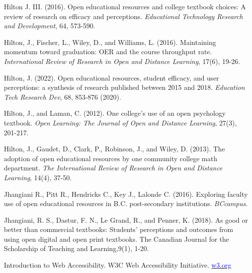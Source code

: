 \documentclass[11pt]{article}
\newcommand{\alink}[2]{\href{#1}{\textcolor{blue}{#2}}}
\begin{document}
\begin{thebibliography}{99}
   Hilton J. III. (2016). Open educational resources and college textbook choices: A review of research on efficacy and perceptions. {\em Educational Technology Research and Development}, 64, 573-590.

   Hilton, J., Fischer, L., Wiley, D., and Williams, L. (2016). Maintaining momentum toward graduation: OER and the course throughput rate. {\em International Review of Research in Open and Distance Learning}, 17(6), 19-26.

   Hilton, J. (2022). Open educational resources, student efficacy, and user perceptions: a synthesis of research published between 2015 and 2018. {\em Education Tech Research Dev}, 68, 853-876 (2020).%

   Hilton, J., and Laman, C. (2012). One college’s use of an open psychology textbook. {\em Open Learning: The Journal of Open and Distance Learning}, 27(3), 201-217.

   Hilton, J., Gaudet, D., Clark, P., Robinson, J., and Wiley, D. (2013). The adoption of open educational resources by one community college math department. {\em The International Review of Research in Open and Distance Learning}, 14(4), 37-50.

   Jhangiani R., Pitt R., Hendricks C., Key J., Lalonde C. (2016). Exploring faculty use of open educational resources in B.C. post-secondary institutions. {\em BCcampus}. %

   Jhangiani, R. S., Dastur, F. N., Le Grand, R., and Penner, K. (2018). As good or better than commercial textbooks: Students' perceptions and outcomes from using open digital and open print textbooks. The Canadian Journal for the Scholarship of Teaching and Learning,9(1), 1-20.

   Introduction to Web Accessibility.  W3C Web Accessibility Initiative. \alink{w3.org}{w3.org}%


\end{thebibliography}
\end{document}
